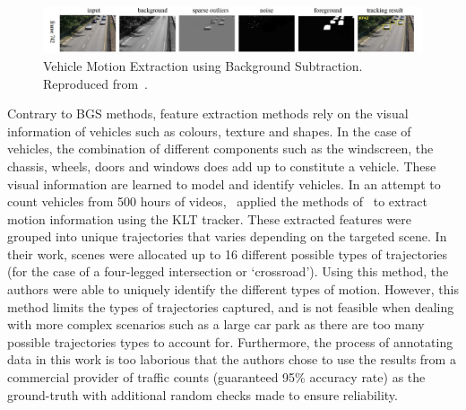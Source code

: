 \begin{figure}[hbt!]
  \centering
 \includegraphics[width=1\textwidth]{image/lit/bgs.PNG}
  \caption[Vehicle Motion Extraction using Background Subtraction. From left:
  Input, Background Model, Sparse Outlier, Noise, Foreground, Tracking Result]
  {Vehicle Motion Extraction using Background Subtraction. %
  Reproduced from~.}
\label{fig:bgs2}
\end{figure}

Contrary to BGS methods, feature extraction methods rely on the visual information of vehicles such as colours, texture and shapes. In the case of vehicles, the combination of different components such as the windscreen, the chassis, wheels, doors and windows does add up to constitute a vehicle. These visual information are learned to model and identify vehicles. In an attempt to count vehicles from 500 hours of
videos,~ applied the methods of~ to extract motion information using the KLT tracker. These extracted features were grouped into unique trajectories that varies
depending on the targeted scene. In their work, scenes were allocated up to
16 different possible types of trajectories (for the case of a four-legged intersection or `crossroad'). Using this method, the authors were
able to uniquely identify the different types of motion. However, this method limits the types of trajectories captured, and is not feasible when dealing with more complex scenarios such as a large car park as there are too many possible trajectories types to account for. Furthermore, the process of annotating data in this work is too laborious 
that the authors chose to use the results from a commercial provider of traffic counts (guaranteed 95\% accuracy rate) as the ground-truth with additional random checks made to ensure reliability.

